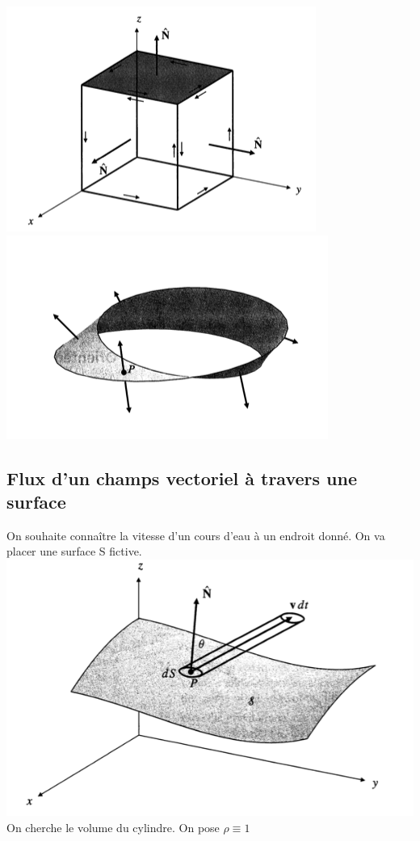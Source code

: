 \includegraphics[scale=0.6]{image7.png}\\
 \includegraphics[scale=0.6]{image8.png}

 \subsection{Flux d'un champs vectoriel à travers une surface}

 On souhaite connaître la vitesse d'un cours d'eau à un endroit donné. On va placer une surface S fictive.\\

 \includegraphics[scale=0.5]{image9.png} %
\\ On cherche le volume du cylindre. On pose $\rho \equiv 1$

